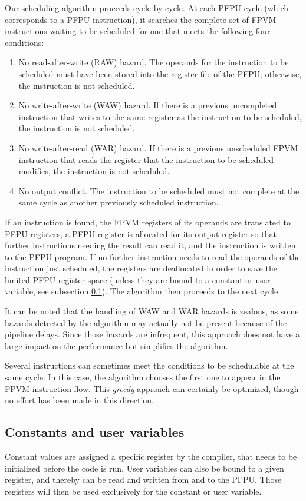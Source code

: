 \documentclass[a4paper,11pt]{kthesis}
\begin{document}
Our scheduling algorithm proceeds cycle by cycle. At each PFPU cycle (which corresponds to a PFPU instruction), it searches the complete set of FPVM instructions waiting to be scheduled for one that meets the following four conditions:
\begin{enumerate}
\item No read-after-write (RAW) hazard. The operands for the instruction to be scheduled must have been stored into the register file of the PFPU, otherwise, the instruction is not scheduled.
\item No write-after-write (WAW) hazard. If there is a previous uncompleted instruction that writes to the same register as the instruction to be scheduled, the instruction is not scheduled.
\item No write-after-read (WAR) hazard. If there is a previous unscheduled FPVM instruction that reads the register that the instruction to be scheduled modifies, the instruction is not scheduled.
\item No output conflict. The instruction to be scheduled must not complete at the same cycle as another previously scheduled instruction.
\end{enumerate}
If an instruction is found, the FPVM registers of its operands are translated to PFPU registers, a PFPU register is allocated for its output register so that further instructions needing the result can read it, and the instruction is written to the PFPU program. If no further instruction needs to read the operands of the instruction just scheduled, the registers are deallocated in order to save the limited PFPU register space (unless they are bound to a constant or user variable, see subsection \ref{subsec:constparam}). The algorithm then proceeds to the next cycle.

It can be noted that the handling of WAW and WAR hazards is zealous, as some hazards detected by the algorithm may actually not be present because of the pipeline delays. Since those hazards are infrequent, this approach does not have a large impact on the performance but simplifies the algorithm.

Several instructions can sometimes meet the conditions to be schedulable at the same cycle. In this case, the algorithm chooses the first one to appear in the FPVM instruction flow. This \textit{greedy} approach can certainly be optimized, though no effort has been made in this direction.

\subsection{Constants and user variables}
\label{subsec:constparam}
Constant values are assigned a specific register by the compiler, that needs to be initialized before the code is run. User variables can also be bound to a given register, and thereby can be read and written from and to the PFPU. Those registers will then be used exclusively for the constant or user variable.
\end{document}
